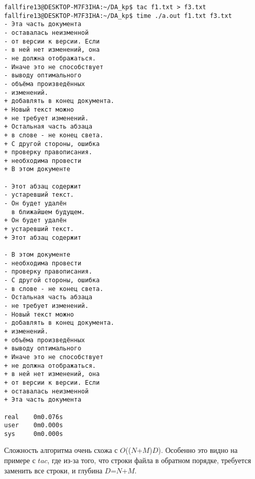 \begin{verbatim}
fallfire13@DESKTOP-M7F3IHA:~/DA_kp$ tac f1.txt > f3.txt
fallfire13@DESKTOP-M7F3IHA:~/DA_kp$ time ./a.out f1.txt f3.txt
- Эта часть документа
- оставалась неизменной
- от версии к версии. Если
- в ней нет изменений, она
- не должна отображаться.
- Иначе это не способствует
- выводу оптимального
- объёма произведённых
- изменений.
+ добавлять в конец документа.
+ Новый текст можно
+ не требует изменений.
+ Остальная часть абзаца
+ в слове - не конец света.
+ С другой стороны, ошибка
+ проверку правописания.
+ необходима провести
+ В этом документе

- Этот абзац содержит
- устаревший текст.
- Он будет удалён
  в ближайшем будущем.
+ Он будет удалён
+ устаревший текст.
+ Этот абзац содержит

- В этом документе
- необходима провести
- проверку правописания.
- С другой стороны, ошибка
- в слове - не конец света.
- Остальная часть абзаца
- не требует изменений.
- Новый текст можно
- добавлять в конец документа.
+ изменений.
+ объёма произведённых
+ выводу оптимального
+ Иначе это не способствует
+ не должна отображаться.
+ в ней нет изменений, она
+ от версии к версии. Если
+ оставалась неизменной
+ Эта часть документа

real    0m0.076s
user    0m0.000s
sys     0m0.000s
\end{verbatim}

Сложность алгоритма очень схожа с $O$(($N$+$M$)$D$). Особенно это видно на примере с $tac$, где из-за того, что строки файла в обратном порядке, требуется заменить все строки, и глубина $D$=$N$+$M$.

\pagebreak